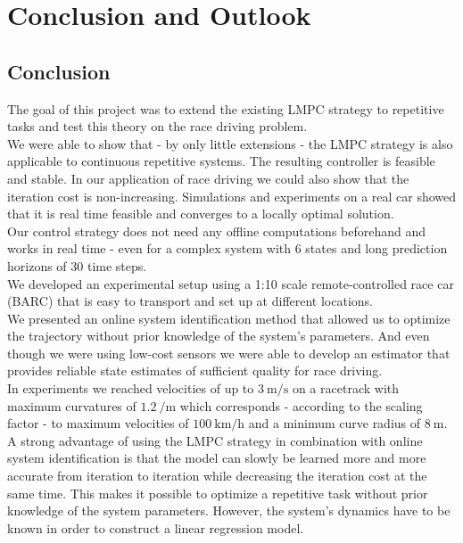 \chapter{Conclusion and Outlook}

\section{Conclusion}
The goal of this project was to extend the existing LMPC strategy to repetitive tasks and test this theory on the race driving problem.\\
We were able to show that - by only little extensions - the LMPC strategy is also applicable to continuous repetitive systems. The resulting controller is feasible and stable. In our application of race driving we could also show that the iteration cost is non-increasing. Simulations and experiments on a real car showed that it is real time feasible and converges to a locally optimal solution.\\
Our control strategy does not need any offline computations beforehand and works in real time - even for a complex system with 6 states and long prediction horizons of 30 time steps.\\
We developed an experimental setup using a 1:10 scale remote-controlled race car (BARC) that is easy to transport and set up at different locations.\\
We presented an online system identification method that allowed us to optimize the trajectory without prior knowledge of the system's parameters. And even though we were using low-cost sensors we were able to develop an estimator that provides reliable state estimates of sufficient quality for race driving.\\
In experiments we reached velocities of up to $\SI{3}{\meter\per\second}$ on a racetrack with maximum curvatures of $\SI{1.2}{\per\meter}$ which corresponds - according to the scaling factor - to maximum velocities of $\SI{100}{\kilo\meter\per\hour}$ and a minimum curve radius of $\SI{8}{\meter}$.\\
A strong advantage of using the LMPC strategy in combination with online system identification is that the model can slowly be learned more and more accurate from iteration to iteration while decreasing the iteration cost at the same time. This makes it possible to optimize a repetitive task without prior knowledge of the system parameters. However, the system's dynamics have to be known in order to construct a linear regression model.\\

